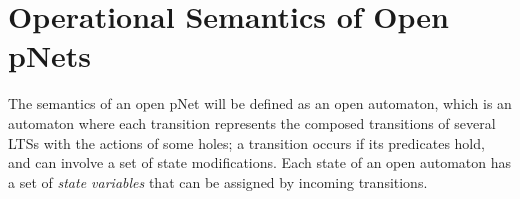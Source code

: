 \documentclass[smallcondensed]{svjour3}
\newcommand{\noteSB}[2][color=green!40, size=\tiny]{\todo[#1]{{\bf Simon: } {#2}}}
\newcommand{\noteEM}[2][color=blue!40, size=\tiny]{\todo[#1]{{\bf Eric: } {#2}}}
\begin{document}
%        
%
%	
%	




\section{Operational Semantics of Open pNets}
\label{section:op-semantics}

The semantics of an open pNet will be defined as an open automaton, which
is an automaton where each transition represents the composed transitions 
of several
LTSs with the actions of some holes; a transition occurs if its predicates hold,
and can involve a set of state modifications. Each state of an open
automaton has a set of \emph{state variables} that can be assigned by
incoming transitions.
\end{document}
